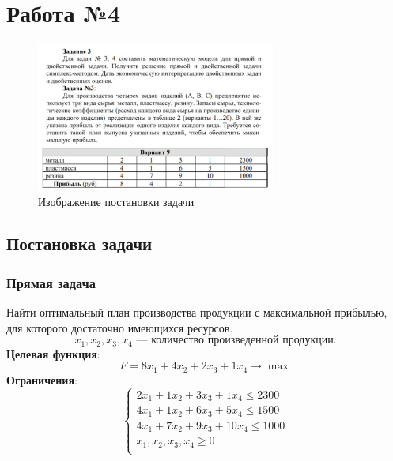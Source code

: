 \documentclass[17pt]{extarticle}
\begin{document}
\section*{Работа №4}
\begin{figure}[h!]
    \centering
    \includegraphics[width=0.7\textwidth]{c.png}
    \caption{Изображение постановки задачи}
\end{figure}

\subsection*{Постановка задачи}

\subsubsection*{Прямая задача}
Найти оптимальный план производства продукции с максимальной прибылью, для которого достаточно имеющихся ресурсов.
\[
    x_1, x_2, x_3, x_4 \text{ — количество произведенной продукции.}
\]
\textbf{Целевая функция}:
\[
    F = 8x_1 + 4x_2 + 2x_3 + 1x_4 \to \max
\]
\textbf{Ограничения}:
\[
    \begin{cases}
        2x_1 + 1x_2 + 3x_3 + 1x_4 \leq 2300  \\
        4x_1 + 1x_2 + 6x_3 + 5x_4 \leq 1500  \\
        4x_1 + 7x_2 + 9x_3 + 10x_4 \leq 1000 \\
        x_1, x_2, x_3, x_4 \geq 0            \\
    \end{cases}
\]
\end{document}
